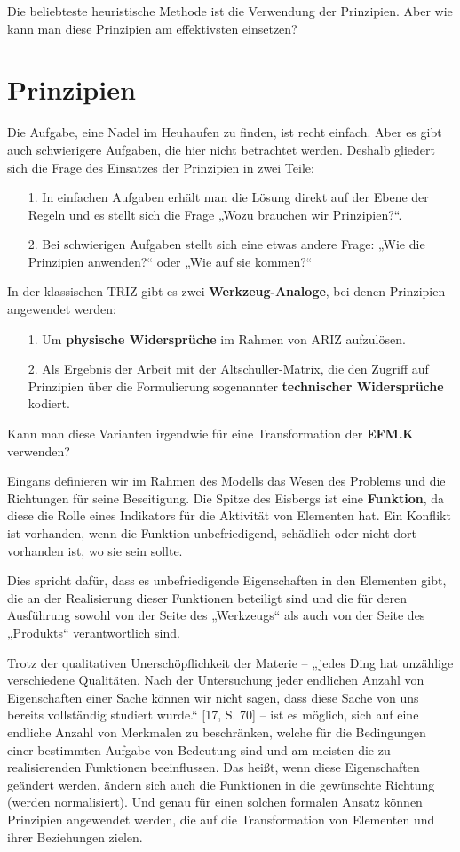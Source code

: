 \documentclass[11pt,a4paper]{article}
\begin{document}
Die beliebteste heuristische Methode ist die Verwendung der Prinzipien. Aber
wie kann man diese Prinzipien am effektivsten einsetzen?

\section*{Prinzipien}

Die Aufgabe, eine Nadel im Heuhaufen zu finden, ist recht einfach. Aber es
gibt auch schwierigere Aufgaben, die hier nicht betrachtet werden. Deshalb
gliedert sich die Frage des Einsatzes der Prinzipien in zwei Teile:
\begin{itemize}
\item[1.] In einfachen Aufgaben erhält man die Lösung direkt auf der Ebene der
  Regeln und es stellt sich die Frage „Wozu brauchen wir Prinzipien?“.
\item[2.] Bei schwierigen Aufgaben stellt sich eine etwas andere Frage: „Wie
  die Prinzipien anwenden?“ oder „Wie auf sie kommen?“
\end{itemize}
In der klassischen TRIZ gibt es zwei \textbf{Werkzeug-Analoge}, bei denen
Prinzipien angewendet werden:
\begin{itemize}
\item[1.] Um \textbf{physische Widersprüche} im Rahmen von ARIZ aufzulösen.
\item[2.] Als Ergebnis der Arbeit mit der Altschuller-Matrix, die den Zugriff
  auf Prinzipien über die Formulierung sogenannter \textbf{technischer
    Widersprüche} kodiert.
\end{itemize}
Kann man diese Varianten irgendwie für eine Transformation der \textbf{EFM.K}
verwenden? 

Eingans definieren wir im Rahmen des Modells das Wesen des Problems und die
Richtungen für seine Beseitigung. Die Spitze des Eisbergs ist eine
\textbf{Funktion}, da diese die Rolle eines Indikators für die Aktivität von
Elementen hat. Ein Konflikt ist vorhanden, wenn die Funktion unbefriedigend,
schädlich oder nicht dort vorhanden ist, wo sie sein sollte.

Dies spricht dafür, dass es unbefriedigende Eigenschaften in den Elementen
gibt, die an der Realisierung dieser Funktionen beteiligt sind und die für
deren Ausführung sowohl von der Seite des „Werkzeugs“ als auch von der Seite
des „Produkts“ verantwortlich sind.

Trotz der qualitativen Unerschöpflichkeit der Materie -- „jedes Ding hat
unzählige verschiedene Qualitäten. Nach der Untersuchung jeder endlichen
Anzahl von Eigenschaften einer Sache können wir nicht sagen, dass diese Sache
von uns bereits vollständig studiert wurde.“ [17, S. 70] -- ist es möglich,
sich auf eine endliche Anzahl von Merkmalen zu beschränken, welche für die
Bedingungen einer bestimmten Aufgabe von Bedeutung sind und am meisten die zu
realisierenden Funktionen beeinflussen. Das heißt, wenn diese Eigenschaften
geändert werden, ändern sich auch die Funktionen in die gewünschte Richtung
(werden normalisiert). Und genau für einen solchen formalen Ansatz können
Prinzipien angewendet werden, die auf die Transformation von Elementen und
ihrer Beziehungen zielen.
\end{document}
